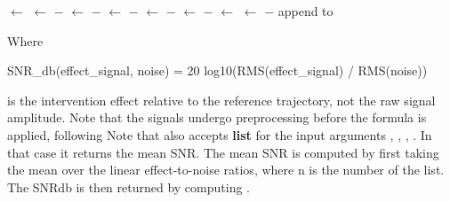 \documentclass[11pt]{article}
\begin{document}
\begin{algorithm}[H]
\label{def:quantify-noise-utility}
\textbf{}\par\smallskip
\begin{algorithmic}[1]
\State {} $\gets$ \code{[]}
        \State {} $\gets$  $-$ 
            \State {} $\gets$  $-$ 
            \State {} $\gets$  $-$ 
            \State {} $\gets$  $-$ 
        \Else
            \State {} $\gets$  $-$ 
        \EndIf
    \Else
        \State {} $\gets$ 
        \State {} $\gets$  $-$ 
    \EndIf
    \State append  to 
\EndFor
\State \Return {}
\end{algorithmic}
\end{algorithm}

Where 
\begin{DocCode}
    SNR_db(effect_signal, noise) = 20 log10(RMS(effect_signal) / RMS(noise))
\end{DocCode}
 is the intervention effect relative to the reference trajectory, not the raw signal amplitude.
Note that the signals undergo preprocessing before the formula is applied, following 
Note that  also accepts \textbf{list} for the input arguments , , , .
In that case it returns the mean SNR. The mean SNR is computed by first taking the mean over the linear effect-to-noise ratios, where n is the number of the list.
The SNRdb is then returned by computing .
\end{document}
